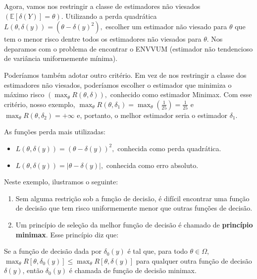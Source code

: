 \documentclass[12pt]{beamer}
\begin{document}
\begin{frame}{}
\begin{block}{}
\justifying
Agora, vamos nos restringir a classe de estimadores não viesados $(\mathbb{E}[\delta(Y)] = \theta).$ Utilizando a perda quadrática $L(\theta, \delta(y))=(\theta-\delta(y)^{2}),$ escolher um estimador não viesado para $\theta$ que tem o menor risco dentre todos os estimadores não viesados para $\theta.$ Nos deparamos com o problema de encontrar o ENVVUM (estimador não tendencioso de variância uniformemente mínima).
\end{block}
\end{frame}

\begin{frame}{}
\begin{block}{}
\justifying
Poderíamos também adotar outro critério. Em vez de nos restringir a classe dos estimadores não viesados, poderíamos escolher o estimador que minimiza o máximo risco $(\max_\theta R(\theta, \delta)),$ conhecido como estimador Minimax. Com esse critério, nosso exemplo, $\max_\theta R(\theta, \delta_1) = \max_\theta \left(\frac{1}{25}\right) = \frac{1}{25}$ e $\max_\theta R(\theta, \delta_2) = +\infty$ e, portanto, o melhor estimador seria o estimador $\delta_{1}.$
\end{block}
\pause
\begin{block}{As funções perda mais utilizadas:}
\justifying
\begin{itemize}
    \item $L(\theta, \delta(y))=(\theta-\delta(y))^{2},$ conhecida como perda quadrática.
    \item $L(\theta, \delta(y))=|\theta-\delta(y)|,$ conhecida como erro absoluto.
\end{itemize}
\end{block}
\end{frame}

\begin{frame}{}
\begin{block}{Neste exemplo, ilustramos o seguinte:}
\justifying
\begin{enumerate}
    \item Sem alguma restrição sob a função de decisão, é difícil encontrar uma função de decisão que tem risco uniformemente menor que outras funções de decisão.\pause
    \item Um princípio de seleção da melhor função de decisão é chamado de \textbf{princípio minimax}. Esse princípio diz que: 
\end{enumerate}
\end{block}

\begin{block}{}
\justifying
Se a função de decisão dada por $\delta_{0}(y)$ é tal que, para todo $\theta \in \Omega$,
$\max_\theta R[\theta, \delta_0(y)] \leq \max_\theta R[\theta, \delta(y)]$
para qualquer outra função de decisão $\delta(y)$, então $\delta_0(y)$ é chamada de função de decisão minimax.
\end{block}
\end{frame}
\end{document}
